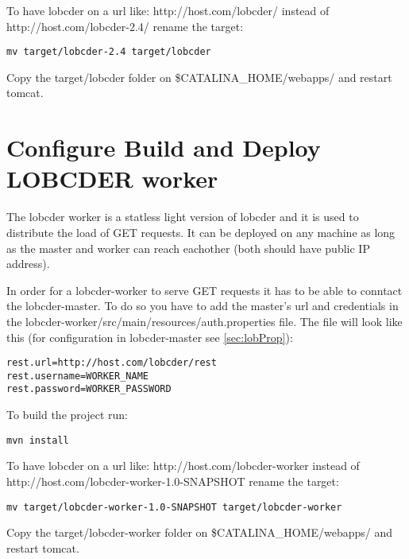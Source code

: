\documentclass[a4paper,10pt]{article}
\begin{document}
To have lobcder on a url like: http://host.com/lobcder/ instead of http://host.com/lobcder-2.4/ rename the target: 
\begin{lstlisting}
mv target/lobcder-2.4 target/lobcder
\end{lstlisting}

Copy the target/lobcder folder on \$CATALINA_HOME/webapps/ and restart tomcat.




\section{Configure Build and Deploy LOBCDER worker}\label{sec:workers}
The lobcder worker is a statless light version of lobcder and it is used to distribute the load of GET requests. It can be deployed on any machine as long as the master and worker can reach eachother (both should have public IP address). 

In order for a lobcder-worker to serve GET requests it has to be able to conntact the lobcder-master. To do so you have to add the master's url and credentials in the  lobcder-worker/src/main/resources/auth.properties file. The file will look like this (for configuration in lobcder-master see \ref{sec:lobProp}):

\begin{lstlisting}
rest.url=http://host.com/lobcder/rest
rest.username=WORKER_NAME
rest.password=WORKER_PASSWORD
\end{lstlisting}

To build the project run:
\begin{lstlisting}
mvn install
\end{lstlisting}

To have lobcder on a url like: http://host.com/lobcder-worker instead of http://host.com/lobcder-worker-1.0-SNAPSHOT rename the target: 

\begin{lstlisting}
mv target/lobcder-worker-1.0-SNAPSHOT target/lobcder-worker
\end{lstlisting}

Copy the target/lobcder-worker folder on \$CATALINA_HOME/webapps/ and restart tomcat.
\end{document}
